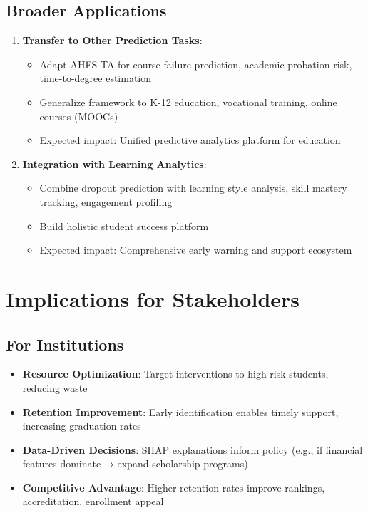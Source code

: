 \subsection{Broader Applications}

\begin{enumerate}
\item \textbf{Transfer to Other Prediction Tasks}:
\begin{itemize}
\item Adapt AHFS-TA for course failure prediction, academic probation risk, time-to-degree estimation
\item Generalize framework to K-12 education, vocational training, online courses (MOOCs)
\item Expected impact: Unified predictive analytics platform for education
\end{itemize}

\item \textbf{Integration with Learning Analytics}:
\begin{itemize}
\item Combine dropout prediction with learning style analysis, skill mastery tracking, engagement profiling
\item Build holistic student success platform
\item Expected impact: Comprehensive early warning and support ecosystem
\end{itemize}
\end{enumerate}

\section{Implications for Stakeholders}

\subsection{For Institutions}

\begin{itemize}
\item \textbf{Resource Optimization}: Target interventions to high-risk students, reducing waste
\item \textbf{Retention Improvement}: Early identification enables timely support, increasing graduation rates
\item \textbf{Data-Driven Decisions}: SHAP explanations inform policy (e.g., if financial features dominate → expand scholarship programs)
\item \textbf{Competitive Advantage}: Higher retention rates improve rankings, accreditation, enrollment appeal
\end{itemize}

